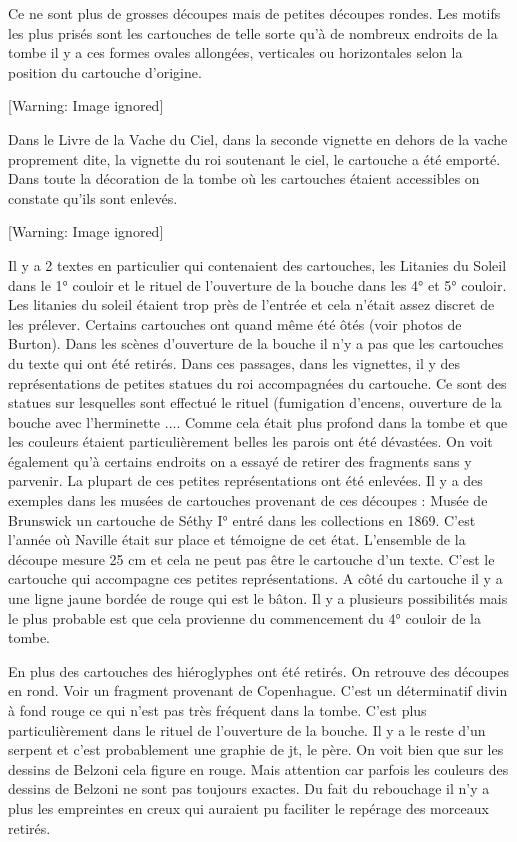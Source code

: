 \documentclass{article}
\begin{document}
Ce ne sont plus de grosses découpes mais de petites découpes rondes. 
Les motifs les plus prisés sont les cartouches de telle sorte qu’à de
nombreux endroits de la tombe il y a ces formes ovales allongées,
verticales ou horizontales selon la position du cartouche d’origine. 

  [Warning: Image ignored] %
 

Dans le Livre de la Vache du Ciel, dans la seconde vignette en dehors de
la vache proprement dite, la vignette du roi soutenant le ciel, le
cartouche a été emporté. Dans toute la décoration de la tombe où les
cartouches étaient accessibles on constate qu’ils sont enlevés.

  [Warning: Image ignored] %
 

Il y a 2 textes en particulier qui contenaient des cartouches, les
Litanies du Soleil dans le 1° couloir et le rituel de l’ouverture de la
bouche dans les 4° et 5° couloir. Les litanies du soleil étaient trop
près de l’entrée et cela n’était assez discret de les prélever.
Certains cartouches ont quand même été ôtés (voir photos de Burton).
Dans les scènes d’ouverture de la bouche il n’y a pas que les
cartouches du texte qui ont été retirés. Dans ces passages, dans les
vignettes, il y des représentations de petites statues du roi
accompagnées du cartouche. Ce sont des statues sur lesquelles sont
effectué le rituel (fumigation d’encens, ouverture de la bouche avec
l’herminette .... Comme cela était plus profond dans la tombe et que
les couleurs étaient particulièrement belles les parois ont été
dévastées. On voit également qu’à certains endroits on a essayé de
retirer des fragments sans y parvenir. La plupart de ces petites
représentations ont été enlevées. Il y a des exemples dans les musées
de cartouches provenant de ces découpes : Musée de Brunswick un
cartouche de Séthy I° entré dans les collections en 1869. C’est l’année
où Naville était sur place et témoigne de cet état. L’ensemble de la
découpe mesure 25 cm et cela ne peut pas être le cartouche d’un texte.
C’est le cartouche qui accompagne ces petites représentations. A côté
du cartouche il y a une ligne jaune bordée de rouge qui est le bâton.
Il y a plusieurs possibilités mais le plus probable est que cela
provienne du commencement du 4° couloir de la tombe. 

En plus des cartouches des hiéroglyphes ont été retirés. On retrouve des
découpes en rond. Voir un fragment provenant de Copenhague. C’est un
déterminatif divin à fond rouge ce qui n’est pas très fréquent dans la
tombe. C’est plus particulièrement dans le rituel de l’ouverture de la
bouche. Il y a le reste d’un serpent et c’est probablement une graphie
de jt, le père. On voit bien que sur les dessins de Belzoni cela figure
en rouge.  Mais attention car parfois les couleurs des dessins de
Belzoni ne sont pas toujours exactes. Du fait du rebouchage  il n’y a
plus les empreintes en creux qui auraient pu faciliter le repérage des
morceaux retirés.
\end{document}
